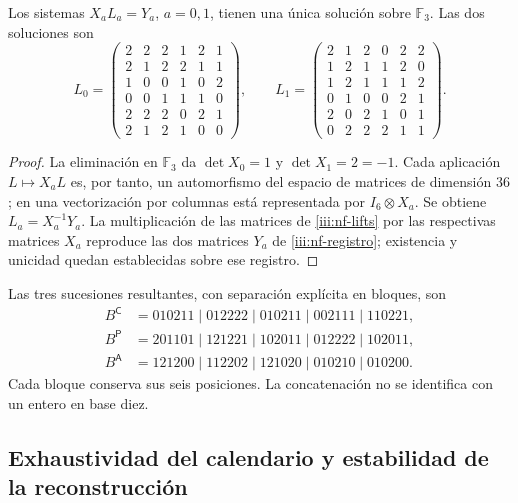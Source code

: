 \begin{proposition}
\label{iii:nf-unicidad}
Los sistemas $X_aL_a=Y_a$, $a=0,1$, tienen una única solución sobre
$\mathbb F_3$. Las dos soluciones son
\begingroup\small
\begin{equation}
L_0=\begin{pmatrix}
2&2&2&1&2&1\\2&1&2&2&1&1\\1&0&0&1&0&2\\
0&0&1&1&1&0\\2&2&2&0&2&1\\2&1&2&1&0&0
\end{pmatrix},\qquad
L_1=\begin{pmatrix}
2&1&2&0&2&2\\1&2&1&1&2&0\\1&2&1&1&1&2\\
0&1&0&0&2&1\\2&0&2&1&0&1\\0&2&2&2&1&1
\end{pmatrix}.
\label{iii:nf-lifts}
\end{equation}
\endgroup
\end{proposition}

\begin{proof}
La eliminación en $\mathbb F_3$ da $\det X_0=1$ y
$\det X_1=2=-1$. Cada aplicación $L\mapsto X_aL$ es, por tanto,
un automorfismo del espacio de matrices de dimensión $36$; en una
vectorización por columnas está representada por $I_6\otimes X_a$.
Se obtiene $L_a=X_a^{-1}Y_a$. La multiplicación de las matrices de
\eqref{iii:nf-lifts} por las respectivas matrices $X_a$ reproduce las
dos matrices $Y_a$ de \eqref{iii:nf-registro}; existencia y unicidad
quedan establecidas sobre ese registro.
\end{proof}

Las tres sucesiones resultantes, con separación explícita en bloques,
son
\begin{align*}
 B^{\mathsf C}&=010211\mid012222\mid010211\mid002111\mid110221,\\
 B^{\mathsf P}&=201101\mid121221\mid102011\mid012222\mid102011,\\
 B^{\mathsf A}&=121200\mid112202\mid121020\mid010210\mid010200.
\end{align*}
Cada bloque conserva sus seis posiciones. La concatenación no se
identifica con un entero en base diez.

\subsection{Exhaustividad del calendario y estabilidad de la reconstrucción}

